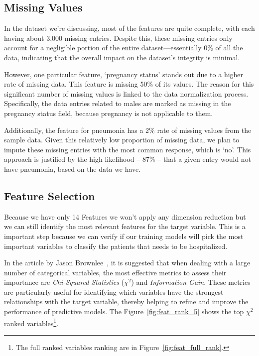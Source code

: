 \subsection{Missing Values}

In the dataset we're discussing, most of the features are quite
complete, with each having about 3,000 missing entries. Despite
this, these missing entries only account for a negligible 
portion of the entire dataset—essentially 0\% of all the data, 
indicating that the overall impact on the dataset's integrity 
is minimal.

However, one particular feature, `pregnancy status' stands 
out due to a higher rate of missing data. This feature is 
missing 50\% of its values. The reason for this significant 
number of missing values is linked to the data normalization
process. Specifically, the data entries related to males are 
marked as missing in the pregnancy status field, because 
pregnancy is not applicable to them.

Additionally, the feature for pneumonia has a 2\% rate of 
missing values from the sample data. Given this relatively low
proportion of missing data, we plan to impute these missing
entries with the most common response, which is `no'. This 
approach is justified by the high likelihood -- 87\% -- that a
given entry would not have pneumonia, based on the data we 
have. 

\subsection{Feature Selection}

Because we have only 14 Features we won't apply any dimension 
reduction but we can still identify the most relevant features
for the target variable. This is a important step because we can
verify if our training models will pick the most important
variables to classify the patients that needs to be hospitalized.

In the article by Jason Brownlee~\parencite[]{2020:brownlee}, it is suggested 
that when dealing with a large number of 
categorical variables, the most 
effective metrics to assess their importance
are \emph{Chi-Squared Statistics} 
($\chi^2$)
and \emph{Information Gain}. These metrics are particularly useful for 
identifying which variables have the strongest 
relationships with the target 
variable, thereby helping to refine and improve the 
performance of predictive 
models. The Figure~\ref{fig:feat_rank_5} shows the top $\chi^2$ ranked
variables\footnote{The full ranked variables ranking are in 
Figure~\ref{fig:feat_full_rank}.}.

